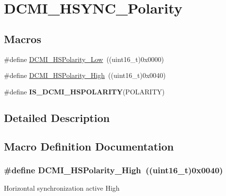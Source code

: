 \hypertarget{group___d_c_m_i___h_s_y_n_c___polarity}{}\section{D\+C\+M\+I\+\_\+\+H\+S\+Y\+N\+C\+\_\+\+Polarity}
\label{group___d_c_m_i___h_s_y_n_c___polarity}
\subsection*{Macros}
\begin{DoxyCompactItemize}
\item 
\#define \hyperlink{group___d_c_m_i___h_s_y_n_c___polarity_ga8be508108ba5f8982a63632c0525b105}{D\+C\+M\+I\+\_\+\+H\+S\+Polarity\+\_\+\+Low}~((uint16\+\_\+t)0x0000)
\item 
\#define \hyperlink{group___d_c_m_i___h_s_y_n_c___polarity_gab7d13846b01ffa41fdfc1987f0a91a67}{D\+C\+M\+I\+\_\+\+H\+S\+Polarity\+\_\+\+High}~((uint16\+\_\+t)0x0040)
\item 
\#define {\bfseries I\+S\+\_\+\+D\+C\+M\+I\+\_\+\+H\+S\+P\+O\+L\+A\+R\+I\+T\+Y}(P\+O\+L\+A\+R\+I\+T\+Y)
\end{DoxyCompactItemize}


\subsection{Detailed Description}


\subsection{Macro Definition Documentation}
\hypertarget{group___d_c_m_i___h_s_y_n_c___polarity_gab7d13846b01ffa41fdfc1987f0a91a67}{}
\subsubsection[{D\+C\+M\+I\+\_\+\+H\+S\+Polarity\+\_\+\+High}]{\setlength{\rightskip}{0pt plus 5cm}\#define D\+C\+M\+I\+\_\+\+H\+S\+Polarity\+\_\+\+High~((uint16\+\_\+t)0x0040)}\label{group___d_c_m_i___h_s_y_n_c___polarity_gab7d13846b01ffa41fdfc1987f0a91a67}
Horizontal synchronization active High \hypertarget{group___d_c_m_i___h_s_y_n_c___polarity_ga8be508108ba5f8982a63632c0525b105}{}
